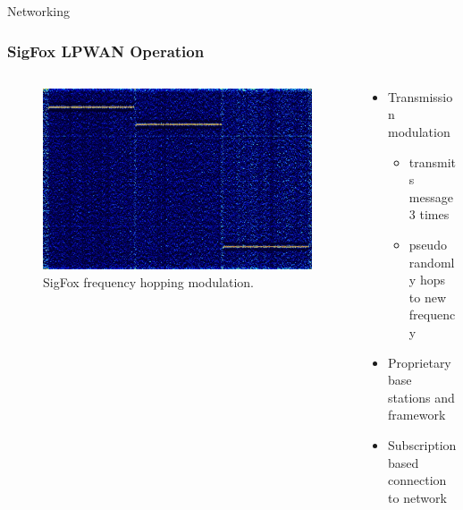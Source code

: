 \documentclass{beamer}
\begin{document}
  \begin{frame}{Networking}
    \frametitle{SigFox LPWAN Operation}
    \begin{columns}
      \begin{column}{0.5\textwidth}
        \begin{figure}[htbp]
          \centering
          \includegraphics[width=\textwidth]{Sigfox_Spectrum_Analysis.jpg}
          \caption{SigFox frequency hopping modulation.\cite{SIGFOXsignalwiki}}
          \label{fig:SigFox_Spectrum}
        \end{figure}
      \end{column}
      \begin{column}{0.5\textwidth}
        \begin{itemize}
          \item Transmission modulation
          \begin{itemize}
            \item transmits message 3 times
            \item pseudo randomly hops to new frequency
          \end{itemize}
          \item Proprietary base stations and framework
          \item Subscription based connection to network
        \end{itemize}
      \end{column}
    \end{columns}
  \end{frame}
\end{document}
